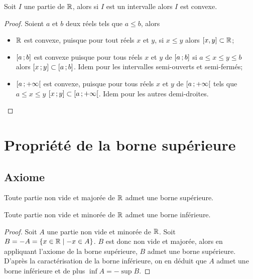 \begin{theo}
  \label{theo:partieconvexe1}
  Soit \(I\) une partie de \(\mathbb{R}\), alors si \(I\) est un intervalle alors \(I\) est convexe.
\end{theo}
\begin{proof}
  Soient \(a\) et \(b\) deux réels tels que \(a\leqslant b\), alors
  \begin{itemize}
  \item \(\mathbb{R}\) est convexe, puisque pour tout réels \(x\) et \(y\), si \(x\leqslant y\) alors \([x,y]\subset \mathbb{R}\);
  \item \(\left[ a \, ;  b \right]\) est convexe puisque pour tous réels \(x\) et \(y\) de \(\left[ a \, ;  b \right]\) si \(a\leqslant x\leqslant y\leqslant b\) alors \(\left[ x \, ;  y \right]\subset \left[ a \, ;  b \right]\). Idem pour les intervalles semi-ouverts et semi-fermés;
  \item \(\left[ a \, ;  +\infty \right[\) est convexe, puisque pour tous réels \(x\) et \(y\) de \(\left[ a \, ;  +\infty \right[\) tels que \(a\leqslant x\leqslant y\) \(\left[ x \, ;  y \right]\subset \left[ a \, ;  +\infty \right[\). Idem pour les autres demi-droites.
  \end{itemize}
\end{proof}

\section{Propriété de la borne supérieure}

\subsection{Axiome}

\begin{theo}
  \label{theo:bornesup}
  Toute partie non vide et majorée de \(\mathbb{R}\) admet une borne supérieure.
\end{theo}
\begin{theo}
  Toute partie non vide et minorée de \(\mathbb{R}\) admet une borne inférieure.
\end{theo}
\begin{proof}
  Soit \(A\) une partie non vide et minorée de \(\mathbb{R}\). Soit \(B=-A=\left\{x\in \mathbb{R}\mathrel{}\middle|\mathrel{}-x \in A\right\}\). \(B\) est donc non vide et majorée, alors en appliquant l'axiome de la borne supérieure, \(B\) admet une borne supérieure. D'après la caractérisation de la borne inférieure, on en déduit que \(A\) admet une borne inférieure et de plus \(\inf A=-\sup B\).
\end{proof}

